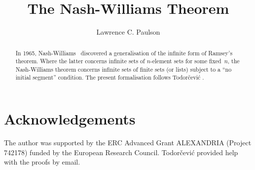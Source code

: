 \documentclass[11pt,a4paper]{article}
\begin{document}
\title{The Nash-Williams Theorem}
\author{Lawrence C. Paulson}
\maketitle

\begin{abstract}
In 1965, Nash-Williams~\cite{nash-williams-quasi} discovered a generalisation of the infinite form of Ramsey's theorem. Where the latter concerns infinite sets of $n$-element sets for some fixed~$n$, the Nash-Williams theorem concerns infinite sets of finite sets (or lists) subject to a ``no initial segment'' condition. The present formalisation follows Todor\v{c}evi{\'c} \cite{todorcevic-ramsey}.
\end{abstract}

\tableofcontents



\section{Acknowledgements}
The author was supported by the ERC Advanced Grant ALEXANDRIA (Project 742178) funded by the European Research Council. Todor\v{c}evi{\'c} provided help with the proofs by email.



\end{document}
